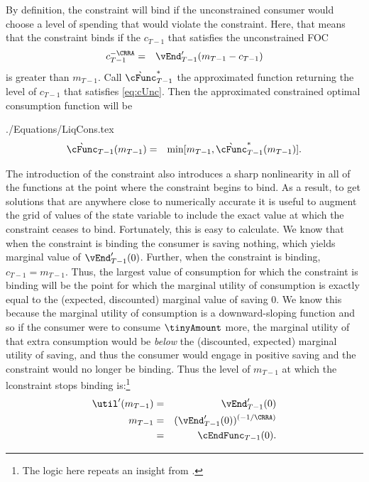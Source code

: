 \documentclass[titlepage]{\econtex}
\begin{document}

By definition, the constraint will bind if the unconstrained consumer
would choose a level of spending that would violate the constraint.
Here, that means that the constraint binds if the ${c}_{T-1}$
that satisfies the unconstrained FOC
\begin{eqnarray}
        {c}_{T-1}^{-\CRRA} & = & \vEnd_{T-1}^{\prime}({m}_{T-1}-{c}_{T-1}) \label{eq:cUnc}
\end{eqnarray}
is greater than ${m}_{T-1}$.  Call $\grave{\cFunc}^{\ast}_{T-1}$ the approximated function
returning the level of ${c}_{T-1}$ that satisfies \eqref{eq:cUnc}.
Then the approximated constrained optimal consumption function will be
\begin{verbatimwrite}{./Equations/LiqCons.tex}
\begin{eqnarray}
        \grave{\cFunc}_{T-1}({m}_{T-1}) & = & \min[{m}_{T-1},\grave{\cFunc}^{\ast}_{T-1}({m}_{T-1})] \label{eq:LiqCons}.
\end{eqnarray}
\end{verbatimwrite}



The introduction of the constraint also introduces a sharp
nonlinearity in all of the functions at the point where the constraint
begins to bind.  As a result, to get solutions that are anywhere close
to numerically accurate it is useful to augment the grid of values of
the state variable to include the exact value at which the constraint
ceases to bind.  Fortunately, this is easy to calculate.  We know that
when the constraint is binding the consumer is saving nothing, which
yields marginal value of $\vEnd_{T-1}^{\prime}(0)$. Further, when the
constraint is binding, ${c}_{T-1} = {m}_{T-1}$.  Thus, the largest
value of consumption for which the constraint is binding will be the
point for which the marginal utility of consumption is exactly equal
to the (expected, discounted) marginal value of saving 0.  We know
this because the marginal utility of consumption is a downward-sloping
function and so if the consumer were to consume $\tinyAmount$ more,
the marginal utility of that extra consumption would be \textit{below}
the (discounted, expected) marginal utility of saving, and thus the
consumer would engage in positive saving and the constraint would no
longer be binding.  Thus the level of ${m}_{T-1}$ at which the
lconstraint stops binding is:\footnote{The logic here repeats an insight from \cite{deatonLiqConstr}.}
\begin{eqnarray}
        \util^{\prime}({m}_{T-1}) & = & \vEnd_{T-1}^{\prime}(0)  \nonumber \\
        {m}_{T-1} & = & (\vEnd_{T-1}^{\prime}(0))^{(-1/\CRRA)}  \nonumber
\\       & = & \cEndFunc_{T-1}(0). \label{eq:LCbindsTm1}
\end{eqnarray}
\end{document}
